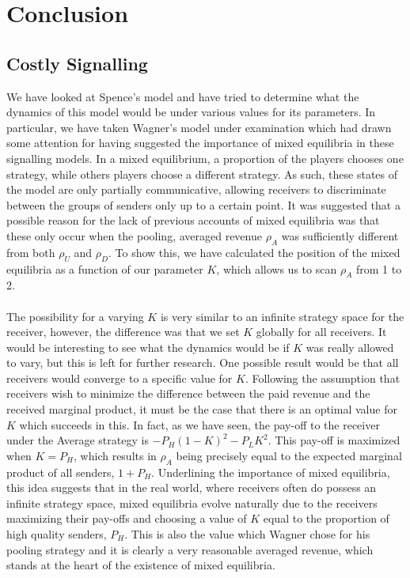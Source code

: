 \documentclass[a4paper,10pt]{article}
\numberwithin{equation}{section}
\begin{document}
\section{Conclusion}
\label{sec:Conclusion}
\subsection{Costly Signalling}
\label{sec:Costly Signalling}

We have looked at Spence's model and have tried to determine what the dynamics of this model would be under various values for its parameters. In particular, we have taken Wagner's model under examination which had drawn some attention for having suggested the importance of mixed equilibria in these signalling models. In a mixed equilibrium, a proportion of the players chooses one strategy, while others players choose a different strategy. As such, these states of the model are only partially communicative, allowing receivers to discriminate between the groups of senders only up to a certain point. It was suggested that a possible reason for the lack of previous accounts of mixed equilibria was that these only occur when the pooling, averaged revenue $\rho_A$ was sufficiently different from both $\rho_U$ and $\rho_D$. To show this, we have calculated the position of the mixed equilibria as a function of our parameter $K$, which allows us to scan $\rho_A$ from 1 to 2.\\
\\
The possibility for a varying $K$ is very similar to an infinite strategy space for the receiver, however, the difference was that we set $K$ globally for all receivers. It would be interesting to see what the dynamics would be if $K$ was really allowed to vary, but this is left for further research. One possible result would be that all receivers would converge to a specific value for $K$. Following the assumption that receivers wish to minimize the difference between the paid revenue and the received marginal product, it must be the case that there is an optimal value for $K$ which succeeds in this. In fact, as we have seen, the pay-off to the receiver under the Average strategy is $-P_H (1-K)^2-P_L K^2$. This pay-off is maximized when $K=P_H$, which results in $\rho_A$ being precisely equal to the expected marginal product of all senders,  $1+P_H$. Underlining the importance of mixed equilibria, this idea suggests that in the real world, where receivers often do possess an infinite strategy space, mixed equilibria evolve naturally due to the receivers maximizing their pay-offs and choosing a value of $K$ equal to the proportion of high quality senders, $P_H$. This is also the value which Wagner chose for his pooling strategy and it is clearly a very reasonable averaged revenue, which stands at the heart of the existence of mixed equilibria.\\
\end{document}
